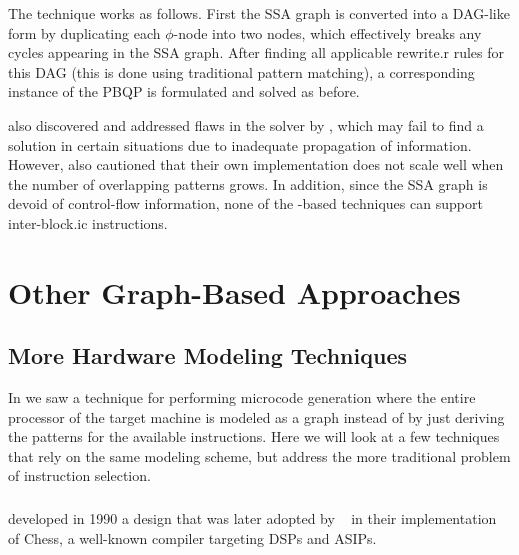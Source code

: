 The technique works as follows.
%
First the \gls{SSA graph} is converted into a \gls{DAG}-like form by duplicating
each \mbox{$\phi$-\gls{node}} into two \glspl{node}, which effectively breaks
any \glspl{cycle} appearing in the \gls{SSA graph}.
%
After finding all applicable \gls{rewrite.r} \glspl{rule} for this \gls{DAG}
(this is done using traditional \gls{pattern matching}), a corresponding
instance of the \gls{PBQP} is formulated and solved as before.

\citeauthor{BuchwaldZwinkau:2010} also discovered and addressed flaws in the
 solver by \citeauthor{EcksteinEtAl:2003}, which may fail to find
a solution in certain situations due to inadequate propagation of information.
%
However, \citeauthor{BuchwaldZwinkau:2010} also cautioned that their own
implementation does not scale well when the number of overlapping
\glspl{pattern} grows.
%
In addition, since the \gls{SSA graph} is devoid of control-flow information,
none of the -based techniques can support \gls{inter-block.ic}
\glspl{instruction}.


\section{Other Graph-Based Approaches}

\subsection{More Hardware Modeling Techniques}

In  we saw a technique for performing \gls{microcode
  generation} where the entire processor of the \gls{target machine} is modeled
as a \gls{graph} instead of by just deriving the \glspl{pattern} for the
available \glspl{instruction}.
%
Here we will look at a few techniques that rely on the same modeling scheme, but
address the more traditional problem of \gls{instruction selection}.


\subsubsection{}

\textcite{LanneerEtAl:1990} developed in 1990 a design that was later adopted by
\citeauthor{VanPraetEtAl:1994}~\cite{VanPraetEtAl:1994, VanPraetEtAl:2001} in
their implementation of \gls{Chess}, a well-known compiler targeting \glspl{DSP}
and \glspl{ASIP}.

